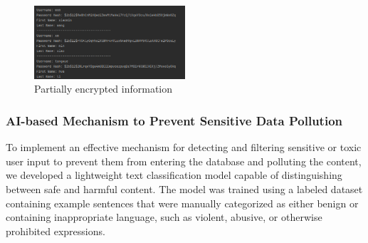 \documentclass{article}
\begin{document}
\begin{figure}[H]
    \centering
    \includegraphics[width=0.5\textwidth]{images/Partially_encrypted_information.png}
    \caption{Partially encrypted information}
    \label{fig:hash}
\end{figure}

\subsubsection{AI-based Mechanism to Prevent Sensitive Data Pollution }
To implement an effective mechanism for detecting and filtering sensitive or toxic user input to prevent them from entering the database and polluting the content, we developed a lightweight text classification model capable of distinguishing between safe and harmful content. The model was trained using a labeled dataset containing example sentences that were manually categorized as either benign or containing inappropriate language, such as violent, abusive, or otherwise prohibited expressions. 
\end{document}
